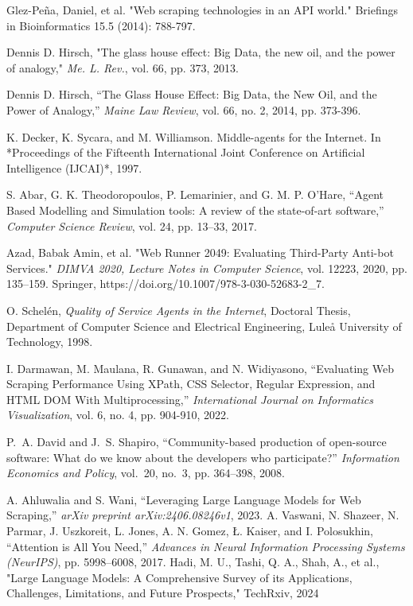 \documentclass[english,master]{unibg}
\begin{document}
\begin{thebibliography}{1}
 Glez-Peña, Daniel, et al. "Web scraping technologies in an API world." Briefings in Bioinformatics 15.5 (2014): 788-797.

Dennis D. Hirsch,  
"The glass house effect: Big Data, the new oil, and the power of analogy,"  
\textit{Me. L. Rev.}, vol. 66, pp. 373, 2013.  

Dennis D. Hirsch, ``The Glass House Effect: Big Data, the New Oil, and the Power of Analogy,'' \textit{Maine Law Review}, vol. 66, no. 2, 2014, pp. 373-396.

K. Decker, K. Sycara, and M. Williamson. Middle-agents for the Internet. In *Proceedings of the Fifteenth International Joint Conference on Artificial Intelligence (IJCAI)*, 1997.

    S. Abar, G. K. Theodoropoulos, P. Lemarinier, and G. M. P. O’Hare, ``Agent Based Modelling and Simulation tools: A review of the state-of-art software,'' \emph{Computer Science Review}, vol. 24, pp. 13–33, 2017.

 Azad, Babak Amin, et al. "Web Runner 2049: Evaluating Third-Party Anti-bot Services." \textit{DIMVA 2020, Lecture Notes in Computer Science}, vol. 12223, 2020, pp. 135–159. Springer, https://doi.org/10.1007/978-3-030-52683-2\_7.

O. Schelén, \emph{Quality of Service Agents in the Internet}, Doctoral Thesis, Department of Computer Science and Electrical Engineering, Luleå University of Technology, 1998.

I. Darmawan, M. Maulana, R. Gunawan, and N. Widiyasono, ``Evaluating Web Scraping Performance Using XPath, CSS Selector, Regular Expression, and HTML DOM With Multiprocessing,'' \emph{International Journal on Informatics Visualization}, vol. 6, no. 4, pp. 904-910, 2022.

P.~A. David and J.~S. Shapiro, ``Community-based production of open-source software: What do we know about the developers who participate?'' \emph{Information Economics and Policy}, vol.~20, no.~3, pp. 364–398, 2008.

    A. Ahluwalia and S. Wani, ``Leveraging Large Language Models for Web Scraping,'' \emph{arXiv preprint arXiv:2406.08246v1}, 2023.
A. Vaswani, N. Shazeer, N. Parmar, J. Uszkoreit, L. Jones, A. N. Gomez, Ł. Kaiser, and I. Polosukhin, ``Attention is All You Need,'' \textit{Advances in Neural Information Processing Systems (NeurIPS)}, pp. 5998--6008, 2017.
  Hadi, M. U., Tashi, Q. A., Shah, A., et al., "Large Language Models: A Comprehensive Survey of its Applications, Challenges, Limitations, and Future Prospects," TechRxiv, 2024


\end{thebibliography}
\end{document}
